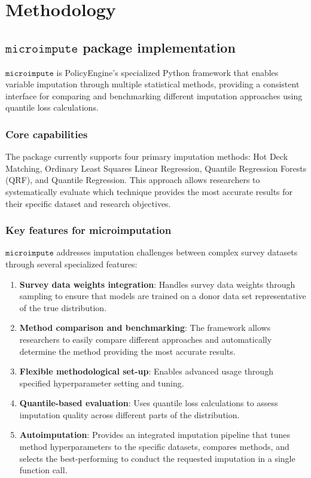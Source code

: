 \section{Methodology}\label{sec:methodology}

\subsection{$\texttt{microimpute}$ package implementation}

$\texttt{microimpute}$ is PolicyEngine's specialized Python framework that enables variable imputation through multiple statistical methods, providing a consistent interface for comparing and benchmarking different imputation approaches using quantile loss calculations.

\subsubsection{Core capabilities}

The package currently supports four primary imputation methods: Hot Deck Matching, Ordinary Least Squares Linear Regression, Quantile Regression Forests (QRF), and Quantile Regression. This approach allows researchers to systematically evaluate which technique provides the most accurate results for their specific dataset and research objectives.

\subsubsection{Key features for microimputation}

$\texttt{microimpute}$ addresses imputation challenges between complex survey datasets through several specialized features:

\begin{enumerate}
    \item \textbf{Survey data weights integration}: Handles survey data weights through sampling to ensure that models are trained on a donor data set representative of the true distribution.
    \item \textbf{Method comparison and benchmarking}: The framework allows researchers to easily compare different approaches and automatically determine the method providing the most accurate results.
    \item \textbf{Flexible methodological set-up}: Enables advanced usage through specified hyperparameter setting and tuning.
    \item \textbf{Quantile-based evaluation}: Uses quantile loss calculations to assess imputation quality across different parts of the distribution.
    \item \textbf{Autoimputation}: Provides an integrated imputation pipeline that tunes method hyperparameters to the specific datasets, compares methods, and selects the best-performing to conduct the requested imputation in a single function call.
\end{enumerate}


